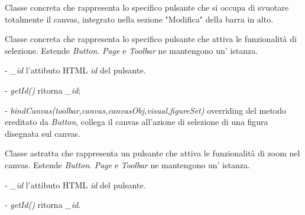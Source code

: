 Classe concreta che rappresenta lo specifico pulsante che si occupa di svuotare totalmente il canvas, integrato nella sezione "Modifica" della barra in alto.

Classe concreta che rappresenta lo specifico pulsante che attiva le funzionalit\` a di selezione.
Estende \textit{Button}.
\textit{Page} e \textit{Toolbar} ne mantengono un' istanza.
\begin{elencopuntato}[\subsubsecindent]
\item[-] \textit{{\_}id} l'attibuto HTML \textit{id} del pulsante.
\end{elencopuntato}
\begin{elencopuntato}[\subsubsecindent]
\item[-] \textit{getId()} ritorna  \textit{{\_}id};
\item[-]  \textit{bindCanvas(toolbar,canvas,canvasObj,visual,figureSet)} overriding del metodo ereditato da \textit{Button}, collega il canvas all'azione di selezione di una figura disegnata sul canvas.
\end{elencopuntato}


Classe astratta che rappresenta un pulsante che attiva le funzionalit\` a di zoom nel canvas.
Estende \textit{Button}.
\textit{Page} e \textit{Toolbar} ne mantengono un' istanza.
\begin{elencopuntato}[\subsubsecindent]
\item[-] \textit{{\_}id} l'attibuto HTML \textit{id} del pulsante.
\end{elencopuntato}
\begin{elencopuntato}[\subsubsecindent]
\item[-] \textit{getId()} ritorna \textit{{\_}id}.
\end{elencopuntato}

